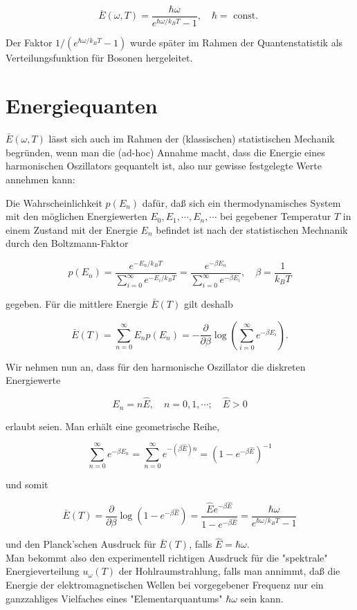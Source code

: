 \documentclass[10pt, letterpaper]{article}
\begin{document}
$$
\bar{E}(\omega, T)=\frac{\hbar \omega}{e^{\hbar \omega / k_{B} T}-1}, \quad \hbar=\text { const. }
$$

Der Faktor $1 /\left(e^{\hbar \omega / k_{B} T}-1\right)$ wurde später im Rahmen der Quantenstatistik als Verteilungsfunktion für Bosonen hergeleitet.

\section*{Energiequanten}
$\bar{E}(\omega, T)$ lässt sich auch im Rahmen der (klassischen) statistischen Mechanik begründen, wenn man die (ad-hoc) Annahme macht, dass die Energie eines harmonischen Oszillators gequantelt ist, also nur gewisse festgelegte Werte annehmen kann:

Die Wahrscheinlichkeit $p\left(E_{n}\right)$ dafür, daß sich ein thermodynamisches System mit den möglichen Energiewerten $E_{0}, E_{1}, \cdots, E_{n}, \cdots$ bei gegebener Temperatur $T$ in einem Zustand mit der Energie $E_{n}$ befindet ist nach der statistischen Mechnanik durch den Boltzmann-Faktor

$$
p\left(E_{n}\right)=\frac{e^{-E_{n} / k_{B} T}}{\sum_{i=0}^{\infty} e^{-E_{i} / k_{B} T}}=\frac{e^{-\beta E_{n}}}{\sum_{i=0}^{\infty} e^{-\beta E_{i}}}, \quad \beta=\frac{1}{k_{B} T}
$$

gegeben. Für die mittlere Energie $\bar{E}(T)$ gilt deshalb

$$
\bar{E}(T)=\sum_{n=0}^{\infty} E_{n} p\left(E_{n}\right)=-\frac{\partial}{\partial \beta} \log \left(\sum_{i=0}^{\infty} e^{-\beta E_{i}}\right) .
$$

Wir nehmen nun an, dass für den harmonische Oszillator die diskreten Energiewerte

$$
E_{n}=n \hat{E}, \quad n=0,1, \cdots ; \quad \hat{E}>0
$$

erlaubt seien. Man erhält eine geometrische Reihe,

$$
\sum_{n=0}^{\infty} e^{-\beta E_{n}}=\sum_{n=0}^{\infty} e^{-(\beta \hat{E}) n}=\left(1-e^{-\beta \hat{E}}\right)^{-1}
$$

und somit

$$
\bar{E}(T)=\frac{\partial}{\partial \beta} \log \left(1-e^{-\beta \hat{E}}\right)=\frac{\hat{E} e^{-\beta \hat{E}}}{1-e^{-\beta \hat{E}}}=\frac{\hbar \omega}{e^{\hbar \omega / k_{B} T}-1}
$$

und den Planck'schen Ausdruck für $\bar{E}(T)$, falls $\hat{E}=\hbar \omega$.\\
Man bekommt also den experimentell richtigen Ausdruck für die "spektrale" Energieverteilung $u_{\omega}(T)$ der Hohlraumstrahlung, falls man annimmt, daß die Energie der elektromagnetischen Wellen bei vorgegebener Frequenz nur ein ganzzahliges Vielfaches eines "Elementarquantums" $\hbar \omega$ sein kann.
\end{document}
